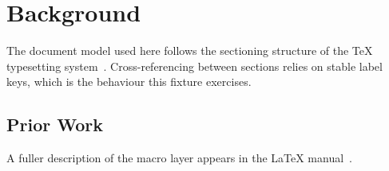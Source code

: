 \section{Background}
\label{sec:background}
The document model used here follows the sectioning structure of the TeX
typesetting system~\cite{knuth1984}. Cross-referencing between sections relies on
stable label keys, which is the behaviour this fixture exercises.

\subsection{Prior Work}
\label{sec:prior-work}
A fuller description of the macro layer appears in the LaTeX manual~\cite{lamport1994}.

